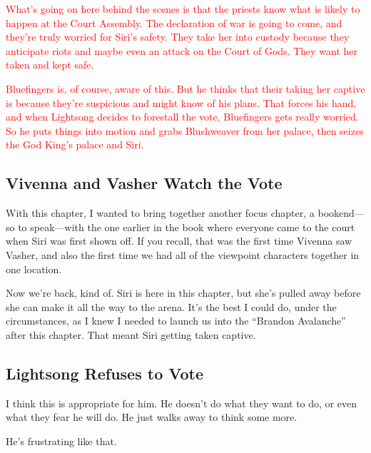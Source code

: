 \textcolor{red}{
What’s going on here behind the scenes is that the priests know what is likely to happen at the Court Assembly. The declaration of war is going to come, and they’re truly worried for Siri’s safety. They take her into custody because they anticipate riots and maybe even an attack on the Court of Gods. They want her taken and kept safe.
}

\textcolor{red}{
Bluefingers is, of course, aware of this. But he thinks that their taking her captive is because they’re suspicious and might know of his plans. That forces his hand, and when Lightsong decides to forestall the vote, Bluefingers gets really worried. So he puts things into motion and grabs Blushweaver from her palace, then seizes the God King’s palace and Siri.
}

\subsection*{Vivenna and Vasher Watch the Vote}

With this chapter, I wanted to bring together another focus chapter, a bookend—so to speak—with the one earlier in the book where everyone came to the court when Siri was first shown off. If you recall, that was the first time Vivenna saw Vasher, and also the first time we had all of the viewpoint characters together in one location.

Now we’re back, kind of. Siri is here in this chapter, but she’s pulled away before she can make it all the way to the arena. It’s the best I could do, under the circumstances, as I knew I needed to launch us into the “Brandon Avalanche” after this chapter. That meant Siri getting taken captive.

\subsection*{Lightsong Refuses to Vote}

I think this is appropriate for him. He doesn’t do what they want to do, or even what they fear he will do. He just walks away to think some more.

He’s frustrating like that.



